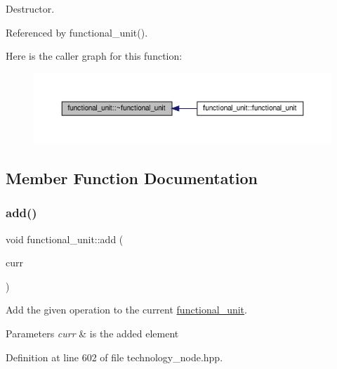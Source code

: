 Destructor. 



Referenced by functional\+\_\+unit().

Here is the caller graph for this function\+:
\nopagebreak
\begin{figure}[H]
\begin{center}
\leavevmode
\includegraphics[width=350pt]{d8/dd6/structfunctional__unit_a356a9b93866182523e867b92e8a2ffd6_icgraph}
\end{center}
\end{figure}


\subsection{Member Function Documentation}
\mbox{\label{structfunctional__unit_a8f9bce347984b438b96be67920000437}} 
\subsubsection{\texorpdfstring{add()}{add()}}
{\footnotesize\ttfamily void functional\+\_\+unit\+::add (\begin{DoxyParamCaption}\item[{const \hyperlink{technology__node_8hpp_a33dd193b7bd6b987bf0d8a770a819fa7}{technology\+\_\+node\+Ref} \&}]{curr }\end{DoxyParamCaption})\hspace{0.3cm}{\ttfamily [inline]}}



Add the given operation to the current \hyperlink{structfunctional__unit}{functional\+\_\+unit}. 


\begin{DoxyParams}{Parameters}
{\em curr} & is the added element \\
\hline
\end{DoxyParams}


Definition at line 602 of file technology\+\_\+node.\+hpp.



